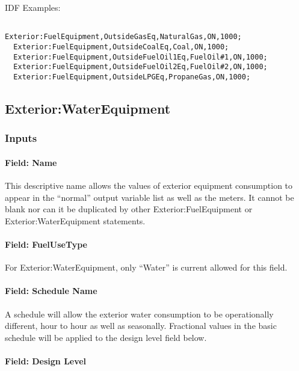 IDF Examples:

\begin{lstlisting}

Exterior:FuelEquipment,OutsideGasEq,NaturalGas,ON,1000;
  Exterior:FuelEquipment,OutsideCoalEq,Coal,ON,1000;
  Exterior:FuelEquipment,OutsideFuelOil1Eq,FuelOil#1,ON,1000;
  Exterior:FuelEquipment,OutsideFuelOil2Eq,FuelOil#2,ON,1000;
  Exterior:FuelEquipment,OutsideLPGEq,PropaneGas,ON,1000;
\end{lstlisting}

\subsection{Exterior:WaterEquipment}\label{exteriorwaterequipment}

\subsubsection{Inputs}\label{inputs-2-014}

\paragraph{Field: Name}\label{field-name-2-013}

This descriptive name allows the values of exterior equipment consumption to appear in the ``normal'' output variable list as well as the meters. It cannot be blank nor can it be duplicated by other Exterior:FuelEquipment or Exterior:WaterEquipment statements.

\paragraph{Field: FuelUseType}\label{field-fuelusetype}

For Exterior:WaterEquipment, only ``Water'' is current allowed for this field.

\paragraph{Field: Schedule Name}\label{field-schedule-name-2-000}

A schedule will allow the exterior water consumption to be operationally different, hour to hour as well as seasonally. Fractional values in the basic schedule will be applied to the design level field below.

\paragraph{Field: Design Level}\label{field-design-level-2}

